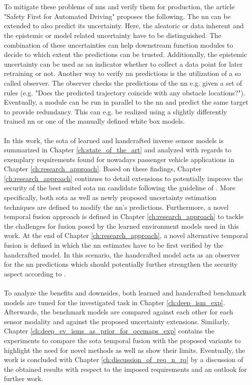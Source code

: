 \\\\
To mitigate these problems of \gls{nn}s and verify them for production, the article "Safety First for Automated Driving" \cite{safetyfirst2019} proposes the following. The \gls{nn} can be extended to also predict its uncertainty. Here, the aleatoric or data inherent and the epistemic or model related uncertainty have to be distinguished. The combination of these uncertainties can help downstream function modules to decide to which extent the predictions can be trusted. Additionally, the epistemic uncertainty can be used as an indicator whether to collect a data point for later retraining or not. Another way to verify \gls{nn} predictions is the utilization of a so called observer. The observer checks the predictions of the \gls{nn} e.g. given a set of rules (e.g. "Does the predicted trajectory coincide with any obstacle locations?"). Eventually, a module can be run in parallel to the \gls{nn} and predict the same target to provide redundancy. This can e.g. be realized using a slightly differently trained \gls{nn} or one of the manually defined white box models.
\\\\
In this work, the \gls{sota} of learned and handcrafted inverse sensor models is summarized in Chapter \ref{ch:state_of_the_art} and analyzed with regards to exemplary requirements found for nowadays passenger vehicle applications in Chapter \ref{ch:research_approach}. Based on these findings, Chapter \ref{ch:research_approach} continues to detail extensions to potentially improve the security of the best suited \gls{sota} \gls{nn} candidate following the guideline of \cite{safetyfirst2019}. More specifically, both \gls{sota} as well as newly proposed uncertainty estimation techniques are defined to modify the \gls{nn}'s predictions. Furthermore, a novel temporal fusion approach is defined in Chapter \ref{ch:research_approach} to tackle the challenges for fusion posed by the learned environment models used in this work. At the end of Chapter \ref{ch:research_approach}, a novel alternative temporal fusion is defined in which the \gls{nn} estimates have to be first verified by the handcrafted model. In this scenario, the handcrafted model acts as an observer for the \gls{nn} predictions which should potentially further strengthen the security aspect according to \cite{safetyfirst2019}.
\\\\
To analyze the benefits and downsides, both learned and handcrafted benchmark models are tuned for the investigated task in Chapter \ref{ch:deep_ism_exp}. Afterwards, the benchmark models are compared against each other for each sensor modality and against the proposed uncertainty extensions. Similarly, Chapter \ref{ch:deep_ev_isms_as_prior_for_occmaps_exp} contains the experiments to compare the \gls{sota} temporal fusion with the proposed variants to highlight the need for novel methods as well as show their limits. Eventually, the work is concluded with Chapter \ref{ch:discussion_of_req_n_rq} by a discussion of the obtained results with respect to the imposed requirements and an outlook for further work.
